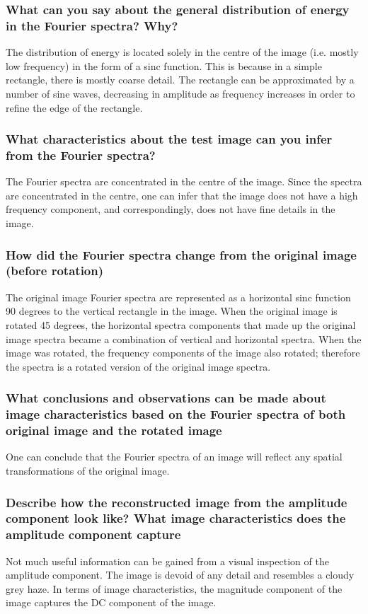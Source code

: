 \documentclass[article, 1.5space, letterpaper, 12pt, oneside, header, footer]{SydeClass}
\begin{document}
\subsubsection{What can you say about the general distribution of energy in the Fourier spectra? Why?}
The distribution of energy is located solely in the centre of the image (i.e. mostly low frequency) in the form of a sinc function. This is because in a simple rectangle, there is mostly coarse detail. The rectangle can be approximated by a number of sine waves, decreasing in amplitude as frequency increases in order to refine the edge of the rectangle.

\subsubsection{What characteristics about the test image can you infer from the Fourier spectra?}
The Fourier spectra are concentrated in the centre of the image. Since the spectra are concentrated in the centre, one can infer that the image does not have a high frequency component, and correspondingly, does not have fine details in the image.

\subsubsection{How did the Fourier spectra change from the original image (before rotation)}
The original image Fourier spectra are represented as a horizontal sinc function 90 degrees to the vertical rectangle in the image. When the original image is rotated 45 degrees, the horizontal spectra components that made up the original image spectra became a combination of vertical and horizontal spectra. When the image was rotated, the frequency components of the image also rotated; therefore the spectra is a rotated version of the original image spectra.

\subsubsection{ What conclusions and observations can be made about image characteristics based on the Fourier
spectra of both original image and the rotated image}
One can conclude that the Fourier spectra of an image will reflect any spatial transformations of the original image.


\subsubsection{Describe how the reconstructed image from the amplitude component look like? What image characteristics does the amplitude component capture}
Not much useful information can be gained from a visual inspection of the amplitude component. The image is devoid of any detail and resembles a cloudy grey haze. In terms of image characteristics, the magnitude component of the image captures the DC component of the image.
\end{document}
